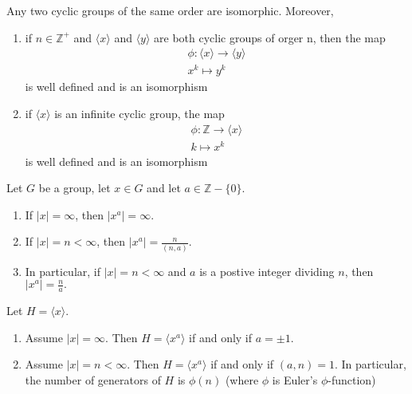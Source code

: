 \documentclass[../main]{subfiles}
\begin{document}
 
 \begin{thm}
  Any two cyclic groups of the same order are isomorphic. Moreover, 
  \begin{enumerate}
   \item if $n\in \mathbb{Z}^+$ and $\langle x \rangle$ and $\langle y \rangle$ are both cyclic groups of orger n, then the map
   \begin{align*}
    \phi \colon \langle x \rangle \to \langle y \rangle \\
    x^k \mapsto y^k
   \end{align*}
   is well defined and is an isomorphism
   \item if $\langle x \rangle$ is an infinite cyclic group, the map 
   \begin{align*}
    \phi \colon \mathbb{Z} \to \langle x \rangle \\
    k \mapsto x^k
   \end{align*}
   is well defined and is an isomorphism
  \end{enumerate}
 \end{thm}

 
 \begin{prop}
  Let $G$ be a group, let $x\in G$ and let $a\in \mathbb{Z}-\{0\}.$
  \begin{enumerate}
   \item If $|x| = \infty$, then $|x^a| = \infty$.
   \item If $|x| = n < \infty$, then $|x^a|=\frac{n}{(n,a)}$.
   \item In particular, if $|x|=n<\infty$ and $a$ is a postive integer dividing $n$, then $|x^a|=\frac{n}{a}.$
  \end{enumerate}
 \end{prop}

 
 \begin{prop}
  Let $H=\langle x\rangle$.
  \begin{enumerate}
   \item Assume $|x|= \infty$. Then $H=\langle x^a \rangle$ if and only if $a=\pm 1$.
   \item Assume $|x| = n <\infty$. Then $H=\langle x^a \rangle$ if and only if $(a,n)=1$. In particular, the number of generators of $H$ is $\phi (n)$ (where $\phi$ is Euler's $\phi$-function)
  \end{enumerate}
 \end{prop}

 
 
\end{document}
